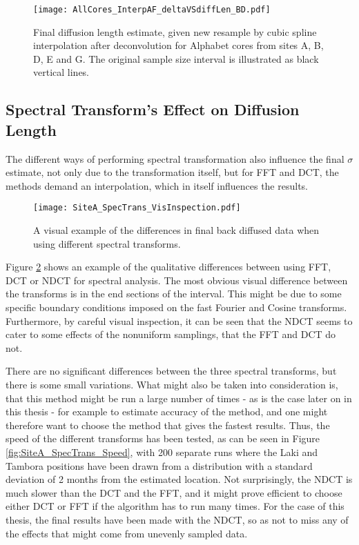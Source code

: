 \documentclass[../../CompleteThesis2/Complete_2ndDraft]{subfiles}
\begin{document}
\begin{figure}[!htb]
	\centering
	\texttt{[image: AllCores\_InterpAF\_deltaVSdiffLen\_BD.pdf]}
	\caption[$\sigma$ vs. resampling size after deconvolution]{\small Final diffusion length estimate, given new resample by cubic spline interpolation after deconvolution for Alphabet cores from sites A, B, D, E and G. The original sample size interval is illustrated as black vertical lines.}
	\label{Fig:COMPMETH_AllCores_SamplingVsDiffLen}\textit{}
\end{figure}


\subsection[Spectral Transforms]{Spectral Transform's Effect on Diffusion Length}
\label{Subsec:Method_TestStab_SpecTrans}
The different ways of performing spectral transformation also influence the final $\sigma$ estimate, not only due to the transformation itself, but for FFT and DCT, the methods demand an interpolation, which in itself influences the results. 

\begin{figure}[!htb]
	\centering
	\texttt{[image: SiteA\_SpecTrans\_VisInspection.pdf]}
	\caption[Spectral transform's effect on $\sigma$]{\small A visual example of the differences in final back diffused data when using different spectral transforms. }
	\label{Fig:SiteA_SpecTrans_VisInspection}
\end{figure}

Figure \ref{Fig:SiteA_SpecTrans_VisInspection} shows an example of the qualitative differences between using FFT, DCT or NDCT for spectral analysis. The most obvious visual difference between the transforms is in the end sections of the interval. This might be due to some specific boundary conditions imposed on the fast Fourier and Cosine transforms. Furthermore, by careful visual inspection, it can be seen that the NDCT seems to cater to some effects of the nonuniform samplings, that the FFT and DCT do not.

There are no significant differences between the three spectral transforms, but there is some small variations. What might also be taken into consideration is, that this method might be run a large number of times - as is the case later on in this thesis - for example to estimate accuracy of the method, and one might therefore want to choose the method that gives the fastest results. Thus, the speed of the different transforms has been tested, as can be seen in Figure \ref{fig:SiteA_SpecTrans_Speed}, with 200 separate runs where the Laki and Tambora positions have been drawn from a distribution with a standard deviation of 2 months from the estimated location. Not surprisingly, the NDCT is much slower than the DCT and the FFT, and it might prove efficient to choose either DCT or FFT if the algorithm has to run many times. For the case of this thesis, the final results have been made with the NDCT, so as not to miss any of the effects that might come from unevenly sampled data.
\end{document}
